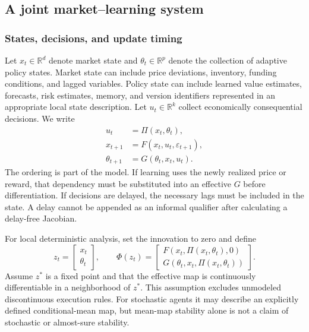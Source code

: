 \documentclass[10pt,twocolumn,letterpaper]{article}
\theoremstyle{definition}
\theoremstyle{remark}
\newcommand{\R}{\mathbb{R}}
\begin{document}
\subsection{A joint market--learning system}
\label{sec:model}
\subsubsection{States, decisions, and update timing}
Let $x_t\in\R^d$ denote market state and $\theta_t\in\R^p$ denote the collection of adaptive policy states. Market state can include price deviations, inventory, funding conditions, and lagged variables. Policy state can include learned value estimates, forecasts, risk estimates, memory, and version identifiers represented in an appropriate local state description. Let $u_t\in\R^k$ collect economically consequential decisions. We write
\begin{align}
 u_t &= \Pi(x_t,\theta_t), \label{eq:policy}\\
 x_{t+1} &= F(x_t,u_t,\varepsilon_{t+1}), \label{eq:market}\\
 \theta_{t+1} &= G(\theta_t,x_t,u_t). \label{eq:learning}
\end{align}
The ordering is part of the model. If learning uses the newly realized price or reward, that dependency must be substituted into an effective $G$ before differentiation. If decisions are delayed, the necessary lags must be included in the state. A delay cannot be appended as an informal qualifier after calculating a delay-free Jacobian.

For local deterministic analysis, set the innovation to zero and define
\begin{equation}
 z_t=\begin{bmatrix}x_t\\\theta_t\end{bmatrix},\qquad
 \Phi(z_t)=\begin{bmatrix}
 F(x_t,\Pi(x_t,\theta_t),0)\\
 G(\theta_t,x_t,\Pi(x_t,\theta_t))
 \end{bmatrix}.
 \label{eq:joint}
\end{equation}
Assume $z^*$ is a fixed point and that the effective map is continuously differentiable in a neighborhood of $z^*$. This assumption excludes unmodeled discontinuous execution rules. For stochastic agents it may describe an explicitly defined conditional-mean map, but mean-map stability alone is not a claim of stochastic or almost-sure stability.
\end{document}
